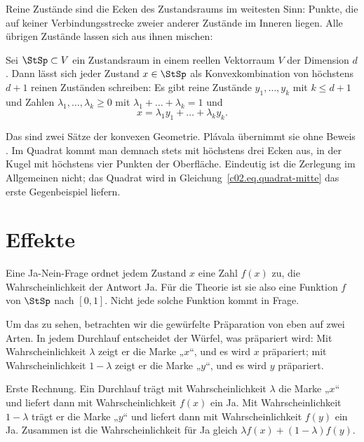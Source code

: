 Reine Zustände sind die Ecken des Zustandsraums im weitesten Sinn: Punkte, die auf keiner
Verbindungsstrecke zweier anderer Zustände im Inneren liegen. Alle übrigen Zustände lassen
sich aus ihnen mischen:

\begin{theorem}\label{c02.thm.zerlegung}
  Sei $\StSp \subset V$ ein Zustandsraum in einem reellen Vektorraum $V$ der Dimension $d$.
  Dann lässt sich jeder Zustand $x \in \StSp$ als Konvexkombination von höchstens $d+1$
  reinen Zuständen schreiben: Es gibt reine Zustände $y_1, \dots, y_k$ mit $k \leq d+1$
  und Zahlen $\lambda_1, \dots, \lambda_k \geq 0$ mit $\lambda_1 + \dots + \lambda_k = 1$
  und
  \begin{equation}\label{c02.eq.zerlegung}
    x = \lambda_1 y_1 + \dots + \lambda_k y_k .
  \end{equation}
\end{theorem}

Das sind zwei Sätze der konvexen Geometrie. Plávala übernimmt sie ohne Beweis
.
Im Quadrat kommt man demnach stets mit höchstens drei Ecken aus, in der Kugel mit höchstens
vier Punkten der Oberfläche. Eindeutig ist die Zerlegung im Allgemeinen nicht; das Quadrat
wird in Gleichung~\eqref{c02.eq.quadrat-mitte} das erste Gegenbeispiel liefern.

\section{Effekte}\label{c02.s3}

Eine Ja-Nein-Frage ordnet jedem Zustand $x$ eine Zahl $f(x)$ zu, die Wahrscheinlichkeit der
Antwort Ja. Für die Theorie ist sie also eine Funktion $f$ von $\StSp$ nach $[0,1]$. Nicht jede
solche Funktion kommt in Frage.

Um das zu sehen, betrachten wir die gewürfelte Präparation von eben auf zwei Arten. In
jedem Durchlauf entscheidet der Würfel, was präpariert wird: Mit Wahrscheinlichkeit
$\lambda$ zeigt er die Marke „$x$“, und es wird $x$ präpariert; mit Wahrscheinlichkeit
$1-\lambda$ zeigt er die Marke „$y$“, und es wird $y$ präpariert.

Erste Rechnung. Ein Durchlauf trägt mit Wahrscheinlichkeit $\lambda$ die Marke „$x$“ und
liefert dann mit Wahrscheinlichkeit $f(x)$ ein Ja. Mit Wahrscheinlichkeit $1-\lambda$ trägt
er die Marke „$y$“ und liefert dann mit Wahrscheinlichkeit $f(y)$ ein Ja. Zusammen ist die Wahrscheinlichkeit für Ja gleich
$\lambda f(x) + (1-\lambda) f(y)$.


